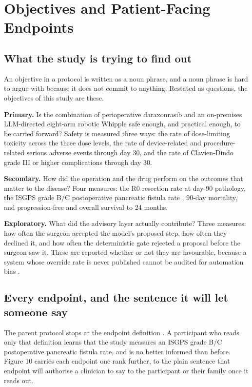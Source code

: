 \section{Objectives and Patient-Facing Endpoints}

\subsection{What the study is trying to find out}

An objective in a protocol is written as a noun phrase, and a noun phrase is
hard to argue with because it does not commit to anything. Restated as
questions, the objectives of this study are these.

\textbf{Primary.} Is the combination of perioperative daraxonrasib and an
on-premises LLM-directed eight-arm robotic Whipple safe enough, and practical
enough, to be carried forward? Safety is measured three ways: the rate of
dose-limiting toxicity across the three dose levels, the rate of device-related
and procedure-related serious adverse events through day 30, and the rate of
Clavien-Dindo grade III or higher complications through day 30.

\textbf{Secondary.} How did the operation and the drug perform on the outcomes
that matter to the disease? Four measures: the R0 resection rate at day-90
pathology, the ISGPS grade B/C postoperative pancreatic fistula rate
\cite{Bassi2017}, 90-day mortality, and progression-free and overall survival to
24 months.

\textbf{Exploratory.} What did the advisory layer actually contribute? Three
measures: how often the surgeon accepted the model's proposed step, how often
they declined it, and how often the deterministic gate rejected a proposal
before the surgeon saw it. These are reported whether or not they are
favourable, because a system whose override rate is never published cannot be
audited for automation bias \cite{FDATrans2024}.

\subsection{Every endpoint, and the sentence it will let someone say}

The parent protocol stops at the endpoint definition \cite{onpremwhippl}. A
participant who reads only that definition learns that the study measures an
ISGPS grade B/C postoperative pancreatic fistula rate, and is no better informed
than before. Figure 10 carries each endpoint one rank further, to the plain
sentence that endpoint will authorise a clinician to say to the participant or
their family once it reads out.

